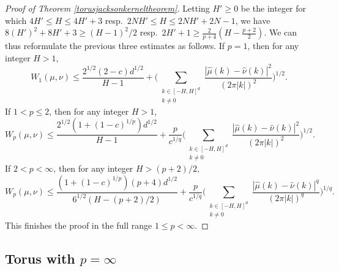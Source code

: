 \documentclass[11pt,a4paper]{article}
\theoremstyle{definition}
\begin{document}
\begin{proof}[Proof of Theorem \ref{torusjacksonkerneltheorem}]
Letting $H' \ge 0$ be the integer for which $4H' \le H \le 4H'+3$ resp.\ $2NH' \le H \le 2NH'+2N-1$, we have $8(H')^2 +8H'+3 \ge (H-1)^2 /2$ resp.\ $2H' +1 \ge \frac{2}{p+4} ( H-\frac{p+2}{2})$. We can thus reformulate the previous three estimates as follows. If $p=1$, then for any integer $H>1$,
\[ W_1(\mu, \nu) \le \frac{2^{1/2}(2-c)d^{1/2}}{H-1} + \Bigg( \sum_{\substack{k \in [-H,H]^d \\ k \neq 0}} \frac{|\widehat{\mu}(k) - \widehat{\nu}(k)|^2}{(2 \pi |k|)^2} \Bigg)^{1/2} . \]
If $1<p \le 2$, then for any integer $H>1$,
\[ W_p (\mu, \nu) \le \frac{2^{1/2}(1+(1-c)^{1/p})d^{1/2}}{H-1} + \frac{p}{c^{1/q}} \Bigg( \sum_{\substack{k \in [-H,H]^d \\ k \neq 0}} \frac{|\widehat{\mu}(k) - \widehat{\nu}(k)|^2}{(2 \pi |k|)^2} \Bigg)^{1/2} . \]
If $2<p<\infty$, then for any integer $H>(p+2)/2$,
\[ W_p(\mu, \nu) \le \frac{(1+(1-c)^{1/p})(p+4) d^{1/2}}{6^{1/2}(H-(p+2)/2)} + \frac{p}{c^{1/q}} \Bigg( \sum_{\substack{k \in [-H,H]^d \\ k \neq 0}} \frac{|\widehat{\mu}(k) - \widehat{\nu}(k)|^q}{(2 \pi |k|)^q} \Bigg)^{1/q} . \]
This finishes the proof in the full range $1 \le p < \infty$.
\end{proof}

\subsection{Torus with $p=\infty$}
\end{document}
